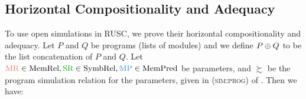 



\subsection{Horizontal Compositionality and Adequacy}
\label{sec:main-verification:theorems}

To use open simulations in RUSC, we prove their horizontal compositionality and adequacy.  Let $P$
and $Q$ be programs (\ie lists of modules) and we define $P \oplus Q$ to be the list concatenation
of $P$ and $Q$.  Let
$\MREL \in \textrm{MemRel}, \SREL \in \textrm{SymbRel}, \MPRED \in \textrm{MemPred}$ be parameters,
and $\succsim$ be the program simulation relation for the parameters,
given in \textsc{(sim:prog)} of .  Then we have:

